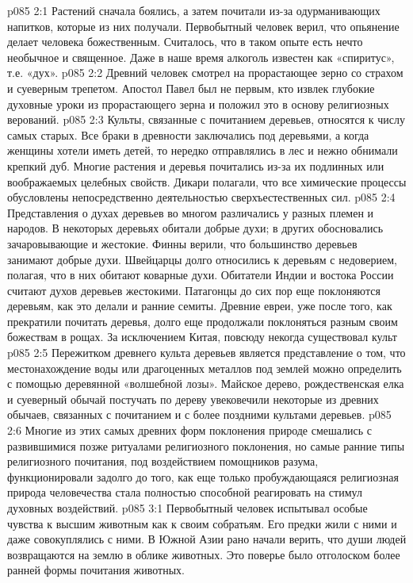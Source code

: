\vs p085 2:1 Растений сначала боялись, а затем почитали из\hyp{}за одурманивающих напитков, которые из них получали. Первобытный человек верил, что опьянение делает человека божественным. Считалось, что в таком опыте есть нечто необычное и священное. Даже в наше время алкоголь известен как «спиритус», т.е. «дух».
\vs p085 2:2 Древний человек смотрел на прорастающее зерно со страхом и суеверным трепетом. Апостол Павел был не первым, кто извлек глубокие духовные уроки из прорастающего зерна и положил это в основу религиозных верований.
\vs p085 2:3 Культы, связанные с почитанием деревьев, относятся к числу самых старых. Все браки в древности заключались под деревьями, а когда женщины хотели иметь детей, то нередко отправлялись в лес и нежно обнимали крепкий дуб. Многие растения и деревья почитались из\hyp{}за их подлинных или воображаемых целебных свойств. Дикари полагали, что все химические процессы обусловлены непосредственно деятельностью сверхъестественных сил.
\vs p085 2:4 Представления о духах деревьев во многом различались у разных племен и народов. В некоторых деревьях обитали добрые духи; в других обосновались зачаровывающие и жестокие. Финны верили, что большинство деревьев занимают добрые духи. Швейцарцы долго относились к деревьям с недоверием, полагая, что в них обитают коварные духи. Обитатели Индии и востока России считают духов деревьев жестокими. Патагонцы до сих пор еще поклоняются деревьям, как это делали и ранние семиты. Древние евреи, уже после того, как прекратили почитать деревья, долго еще продолжали поклоняться разным своим божествам в рощах. За исключением Китая, повсюду некогда существовал культ 
\vs p085 2:5 Пережитком древнего культа деревьев является представление о том, что местонахождение воды или драгоценных металлов под землей можно определить с помощью деревянной «волшебной лозы». Майское дерево, рождественская елка и суеверный обычай постучать по дереву увековечили некоторые из древних обычаев, связанных с почитанием и с более поздними культами деревьев.
\vs p085 2:6 Многие из этих самых древних форм поклонения природе смешались с развившимися позже ритуалами религиозного поклонения, но самые ранние типы религиозного почитания, под воздействием помощников разума, функционировали задолго до того, как еще только пробуждающаяся религиозная природа человечества стала полностью способной реагировать на стимул духовных воздействий.
\vs p085 3:1 Первобытный человек испытывал особые чувства к высшим животным как к своим собратьям. Его предки жили с ними и даже совокуплялись с ними. В Южной Азии рано начали верить, что души людей возвращаются на землю в облике животных. Это поверье было отголоском более ранней формы почитания животных.
